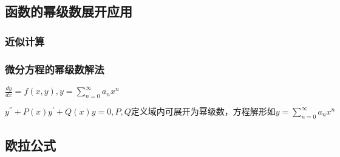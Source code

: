 \documentclass[UTF8]{ctexart}
\newcommand{\mt}[1]{\text{#1}}
\newcommand{\mf}[1]{\left( #1\right)}
\newcommand{\mfa}[1]{\left| #1\right|}
\newcommand{\p}{\par}
\newcommand{\ma}[1]{\begin{array}{llll} #1 \end{array}}
\newcommand{\tp}[1]{\begin{tikzpicture}  #1 \end{tikzpicture}}
\newcommand{\tip}[8]{(intersection of #1,#2--#3,#4 and #5,#6--#7,#8)}
\newcommand{\tpo}[2]{\coordinate  %
 (#1) at #2; }
\newcommand{\da}[2]{\frac{\partial #1}{\partial #2}}
\newcommand{\jisu}[1]{\sum_{n=0}^\infty #1}
\begin{document}
\subsection{函数的幂级数展开应用 }

\subsubsection{近似计算 }

\subsubsection{微分方程的幂级数解法 }

$\frac{dy}{dx}=f\mf{x,y},y=\jisu{a_nx^n}$

$y^{''}+P\mf{x}y^{'}+Q\mf{x}y=0,P,Q\mt{定义域内可展开为幂级数，方程解形如}y=\jisu{a_nx^n}$


\subsection{欧拉公式 }




















 









\end{document}
